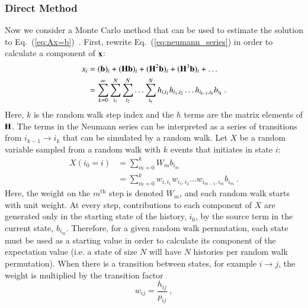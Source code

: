 \documentclass[preprint,12pt]{elsarticle}
\newcommand{\vb}{\ensuremath{\ve{b}}}
\newcommand{\vx}{\ensuremath{\ve{x}}}
\newcommand{\vH}{\ensuremath{\ve{H}}}
\begin{document}
\subsubsection{Direct Method}
\label{sec:direct-method}

Now we consider a Monte Carlo method that can be used to estimate the
solution to Eq.~(\ref{eq:Ax=b})~\cite{hammersley_1964}.  First,
rewrite Eq.~(\ref{eq:neumann_series}) in order to calculate a
component of $\vx$:
\begin{equation}
  \begin{split}
    x_i &= (\vb)_i + (\vH\vb)_i + (\vH^2\vb)_i + (\vH^3\vb)_i +
    \ldots\\ &= \sum_{k=0}^{\infty}\sum_{i_1}^{N}\sum_{i_2}^{N}\ldots
    \sum_{i_k}^{N}h_{i,i_1}h_{i_1,i_2}\ldots h_{i_{k-1},i_k}b_{i_k}\:.
  \end{split}
  \label{eq:neumann_series_i}
\end{equation}
Here, $k$ is the random walk step index and the $h$ terms are the matrix
elements of $\vH$.  The terms in the Neumann series can be interpreted as a
series of transitions from $i_{k-1}\rightarrow i_k$ that can be simulated by a
random walk.  Let $X$ be a random variable sampled from a random walk with $k$
events that initiates in state $i$:
\begin{equation}
  \begin{split}
    X(i_0 = i) &= \sum_{m=0}^{k}W_m b_{i_m}\\ &=
    \sum_{m=0}^{k}w_{i,i_1}w_{i_1,i_2}\ldots w_{i_{m-1},i_m}b_{i_m}\:.
  \end{split}
  \label{eq:estimator_xi}
\end{equation}
Here, the weight on the $m^\text{th}$ step is denoted $W_m$, and each
random walk starts with unit weight. At every step, contributions to
each component of $X$ are generated only in the starting state of the
history, $i_0$, by the source term in the current state,
$b_{i_m}$. Therefore, for a given random walk permutation, each state
must be used as a starting value in order to calculate its component
of the expectation value (i.e. a state of size $N$ will have $N$
histories per random walk permutation). When there is a transition
between states, for example $i\rightarrow j$, the weight is multiplied
by the transition factor
\begin{equation}
  w_{ij} = \frac{h_{ij}}{p_{ij}}\:,
  \label{eq:weight}
\end{equation}
\end{document}

